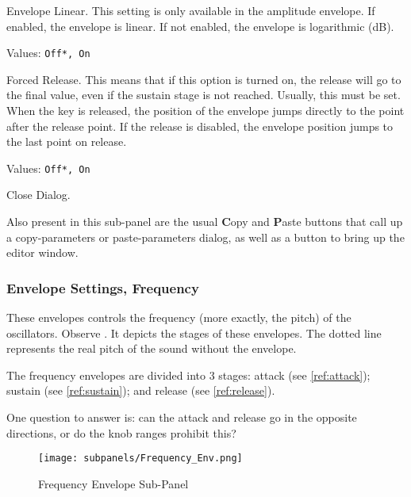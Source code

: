    Envelope Linear.
   This setting is only available in the amplitude envelope.
   If enabled, the envelope is linear.
   If not enabled, the envelope is logarithmic (dB).

   Values: \texttt{Off*, On}

   Forced Release.
   This means that if this option is turned on, the release will go to the
   final value, even if the sustain stage is not reached. Usually, this must
   be set.
   When the key is released, the position of the envelope jumps directly to
   the point after the release point. If the release is disabled, the
   envelope position jumps to the last point on release.

   Values: \texttt{Off*, On}

   Close Dialog.

   Also present in this sub-panel are the usual \textbf{C}opy
   and \textbf{P}aste buttons that call up a copy-parameters or
   paste-parameters dialog, as well as a button
   to bring up the editor window.

\subsubsection{Envelope Settings, Frequency}
\label{subsubsec:envelope_settings_for_frequency}

   These envelopes controls the frequency (more exactly, the pitch) of the
   oscillators.
   Observe .
   It depicts the stages of these envelopes.
   The dotted line represents the real pitch of the sound without the envelope.

   The frequency envelopes are divided into 3 stages:
   attack (see \ref{ref:attack});
   sustain (see \ref{ref:sustain});
   and
   release (see \ref{ref:release}).

   One question to answer is:  
   can the attack and release go in the opposite directions, or do the knob
   ranges prohibit this?

\begin{figure}[H]
   \centering 
   \texttt{[image: subpanels/Frequency\_Env.png]}
   \caption[Frequency Envelope Sub-Panel]{Frequency Envelope Sub-Panel}
   \label{fig:frequency_env}
\end{figure}

